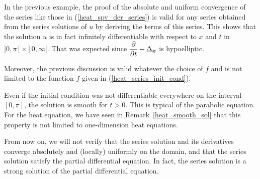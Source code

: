 \begin{rmk}
In the previous example, the proof of the absolute and uniform
convergence of the series like those in (\ref{heat_spv_der_series}) is
valid for any series obtained from the series solutions of $u$ by deriving the
terms of this series.  This shows that the solution $u$ is in fact
infinitely differentiable with respect to $x$ and $t$ in
$]0,\pi[\times ]0,\infty[$.  That was expected since
$\displaystyle \frac{\partial{}}{\partial t} - \Delta_{{\bm{x}}}$ is hypoelliptic.

Moreover, the previous discussion is valid whatever the choice of $f$
and is not limited to the function $f$ given in (\ref{heat_series_init_cond}).

Even if the initial condition was not differentiable everywhere on
the interval $[0,\pi]$, the solution is smooth for $t>0$.  This is
typical of the parabolic equation.  For the heat equation, we have
seen in Remark~\ref{heat_smooth_sol} that this property is not limited
to one-dimension heat equations.
\end{rmk}

From now on, we will not verify that the series solution and its
derivatives converge absolutely and (locally) uniformly on the domain,
and that the series solution satisfy the partial differential
equation.  In fact, the series solution is a strong solution of the
partial differential equation.

